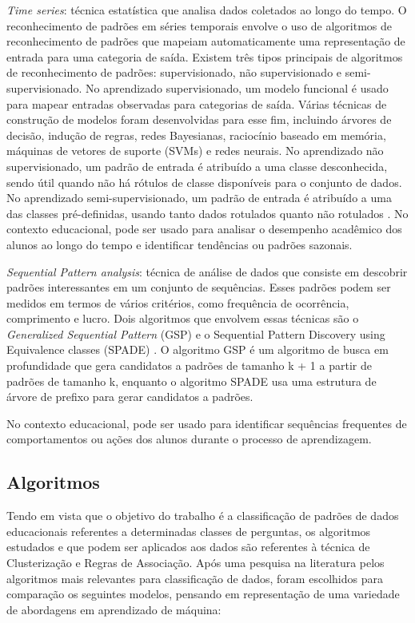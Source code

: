 \begin{enumerate}
{    \item \textit{Time series}: técnica estatística que analisa dados coletados ao longo do tempo. O reconhecimento de padrões em séries temporais envolve o uso de algoritmos de reconhecimento de padrões que mapeiam automaticamente uma representação de entrada para uma categoria de saída. Existem três tipos principais de algoritmos de reconhecimento de padrões: supervisionado, não supervisionado e semi-supervisionado. No aprendizado supervisionado, um modelo funcional é usado para mapear entradas observadas para categorias de saída. Várias técnicas de construção de modelos foram desenvolvidas para esse fim, incluindo árvores de decisão, indução de regras, redes Bayesianas, raciocínio baseado em memória, máquinas de vetores de suporte (SVMs) e redes neurais. No aprendizado não supervisionado, um padrão de entrada é atribuído a uma classe desconhecida, sendo útil quando não há rótulos de classe disponíveis para o conjunto de dados. No aprendizado semi-supervisionado, um padrão de entrada é atribuído a uma das classes pré-definidas, usando tanto dados rotulados quanto não rotulados  \cite{jessica:time}. No contexto educacional, pode ser usado para analisar o desempenho acadêmico dos alunos ao longo do tempo e identificar tendências ou padrões sazonais.

    \item \textit{Sequential Pattern analysis}: técnica de análise de dados que consiste em descobrir padrões interessantes em um conjunto de sequências. Esses padrões podem ser medidos em termos de vários critérios, como frequência de ocorrência, comprimento e lucro. Dois algoritmos que envolvem essas técnicas são o \textit{Generalized Sequential Pattern} (GSP) e o Sequential Pattern Discovery using Equivalence classes (SPADE) \cite{FournierViger2017ASO}. O algoritmo GSP é um algoritmo de busca em profundidade que gera candidatos a padrões de tamanho k + 1 a partir de padrões de tamanho k, enquanto o algoritmo SPADE usa uma estrutura de árvore de prefixo para gerar candidatos a padrões.} No contexto educacional, pode ser usado para identificar sequências frequentes de comportamentos ou ações dos alunos durante o processo de aprendizagem. 
\end{enumerate}

\subsection{Algoritmos}
 
Tendo em vista que o objetivo do trabalho é a classificação de padrões de dados educacionais referentes a determinadas classes de perguntas, os algoritmos estudados e que podem ser aplicados aos dados são referentes à técnica de Clusterização e Regras de Associação. Após uma pesquisa na literatura pelos algoritmos mais relevantes para classificação de dados, foram escolhidos para comparação os seguintes modelos, pensando em representação de uma variedade de abordagens em aprendizado de máquina:

